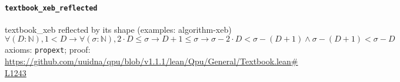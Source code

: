 \documentclass[11pt]{article}
\begin{document}
\paragraph{\texttt{textbook\_xeb\_reflected}}
textbook\_xeb reflected by its shape (examples: algorithm-xeb)
\[ \forall (D : \mathbb{N}), 1 < D \to \forall (\sigma : \mathbb{N}), 2 \cdot D \le \sigma \to D + 1 \le \sigma \to \sigma - 2 \cdot D < \sigma - (D + 1) \land \sigma - (D + 1) < \sigma - D \]
\noindent axioms: \texttt{propext}; proof: \url{https://github.com/uuidna/qpu/blob/v1.1.1/lean/Qpu/General/Textbook.lean\#L1243}
\end{document}
